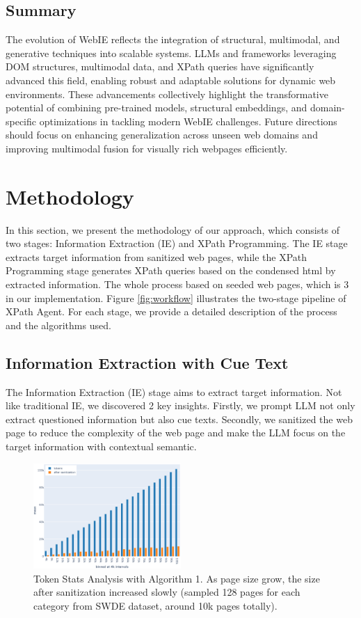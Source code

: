 \documentclass[a4paper]{article}
\begin{document}
\subsection{Summary}

The evolution of WebIE reflects the integration of structural, multimodal, and generative techniques into scalable systems. LLMs and frameworks leveraging DOM structures, multimodal data, and XPath queries have significantly advanced this field, enabling robust and adaptable solutions for dynamic web environments. These advancements collectively highlight the transformative potential of combining pre-trained models, structural embeddings, and domain-specific optimizations in tackling modern WebIE challenges. Future directions should focus on enhancing generalization across unseen web domains and improving multimodal fusion for visually rich webpages efficiently.


\section{Methodology}

In this section, we present the methodology of our approach, which consists of two stages: Information Extraction (IE) and XPath Programming. The IE stage extracts target information from sanitized web pages, while the XPath Programming stage generates XPath queries based on the condensed html by extracted information. The whole process based on seeded web pages, which is 3 in our implementation. Figure \ref{fig:workflow} illustrates the two-stage pipeline of XPath Agent. For each stage, we provide a detailed description of the process and the algorithms used.

\subsection{Information Extraction with Cue Text}

The Information Extraction (IE) stage aims to extract target information. Not like traditional IE, we discovered 2 key insights. Firstly, we prompt LLM not only extract questioned information but also cue texts. Secondly, we sanitized the web page to reduce the complexity of the web page and make the LLM focus on the target information with contextual semantic.

\begin{figure}[h]
  \centering
  \includegraphics[width=0.5\textwidth]{./ie_token_stats.eps}
  \caption{Token Stats Analysis with Algorithm 1. As page size grow, the size after sanitization increased slowly (sampled 128 pages for each category from SWDE dataset, around 10k pages totally).}
  \label{fig:ie_token_stats}
\end{figure}
\end{document}
